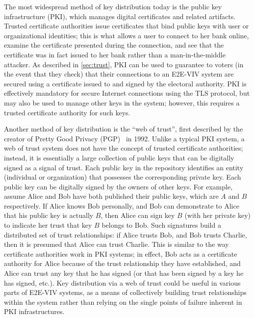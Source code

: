 \begin{itemize}
  The most widespread method of key distribution today is the public
  key infrastructure (PKI), which manages digital certificates and
  related artifacts. Trusted certificate authorities issue
  certificates that bind public keys with user or organizational
  identities; this is what allows a user to connect to her bank
  online, examine the certificate presented during the connection, and
  see that the certificate was in fact issued to her bank rather than
  a man-in-the-middle attacker. As described in \autoref{sec:trust},
  PKI can be used to guarantee to voters (in the event that they
  check) that their connections to an E2E-VIV system are secured using
  a certificate issued to and signed by the electoral authority. PKI
  is effectively mandatory for secure Internet connections using the
  TLS protocol, but may also be used to manage other keys in the
  system; however, this requires a trusted certificate authority for
  such keys. 

  Another method of key distribution is the ``web of trust'', first
  described by the creator of Pretty Good Privacy
  (PGP)~\cite{Zimmermann95} in 1992. Unlike a typical PKI system, a
  web of trust system does not have the concept of trusted certificate
  authorities; instead, it is essentially a large collection of public
  keys that can be digitally signed as a signal of trust. Each public
  key in the repository identifies an entity (individual or
  organization) that possesses the corresponding private key. Each
  public key can be digitally signed by the owners of other keys. For
  example, assume Alice and Bob have both published their public keys,
  which are $A$ and $B$ respectively. If Alice knows Bob personally,
  and Bob can demonstrate to Alice that his public key is actually
  $B$, then Alice can sign key $B$ (with her private key) to indicate
  her trust that key $B$ belongs to Bob. Such signatures build a
  distributed set of trust relationships: if Alice trusts Bob, and Bob
  trusts Charlie, then it is presumed that Alice can trust
  Charlie. This is similar to the way certificate authorities work in
  PKI systems; in effect, Bob acts as a certificate authority for
  Alice because of the trust relationship they have established, and
  Alice can trust any key that he has signed (or that has been signed
  by a key he has signed, etc.). Key distribution via a web of trust
  could be useful in various parts of E2E-VIV systems, as a means of
  collectively building trust relationships within the system rather
  than relying on the single points of failure inherent in PKI
  infrastructures.


\end{itemize}
